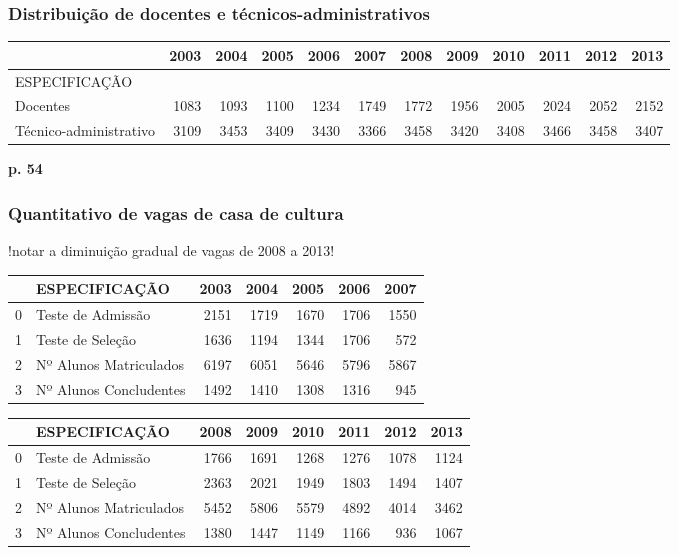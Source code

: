 \documentclass{article}
\begin{document}
\subsubsection{Distribuição de docentes e técnicos-administrativos}

\begin{tabular}{lrrrrrrrrrrr}
\toprule
{} &  2003 &  2004 &  2005 &  2006 &  2007 &  2008 &  2009 &  2010 &  2011 &  2012 &  2013 \\
\midrule
ESPECIFICAÇÃO          &       &       &       &       &       &       &       &       &       &       &       \\
Docentes               &  1083 &  1093 &  1100 &  1234 &  1749 &  1772 &  1956 &  2005 &  2024 &  2052 &  2152 \\
Técnico-administrativo &  3109 &  3453 &  3409 &  3430 &  3366 &  3458 &  3420 &  3408 &  3466 &  3458 &  3407 \\
\bottomrule
\end{tabular}
\textbf{p. 54}

\subsubsection{Quantitativo de vagas de casa de cultura}

!notar a diminuição gradual de vagas de 2008 a 2013!

\begin{tabular}{llrrrrr}
\toprule
{} &           ESPECIFICAÇÃO &  2003 &  2004 &  2005 &  2006 &  2007 \\
\midrule
0 &       Teste de Admissão &  2151 &  1719 &  1670 &  1706 &  1550 \\
1 &        Teste de Seleção &  1636 &  1194 &  1344 &  1706 &   572 \\
2 &  Nº Alunos Matriculados &  6197 &  6051 &  5646 &  5796 &  5867 \\
3 &  Nº Alunos Concludentes &  1492 &  1410 &  1308 &  1316 &   945 \\
\bottomrule
\end{tabular}

\begin{tabular}{llrrrrrr}
\toprule
{} &           ESPECIFICAÇÃO &  2008 &  2009 &  2010 &  2011 &  2012 &  2013 \\
\midrule
0 &       Teste de Admissão &  1766 &  1691 &  1268 &  1276 &  1078 &  1124 \\
1 &        Teste de Seleção &  2363 &  2021 &  1949 &  1803 &  1494 &  1407 \\
2 &  Nº Alunos Matriculados &  5452 &  5806 &  5579 &  4892 &  4014 &  3462 \\
3 &  Nº Alunos Concludentes &  1380 &  1447 &  1149 &  1166 &   936 &  1067 \\
\bottomrule
\end{tabular}
\end{document}
